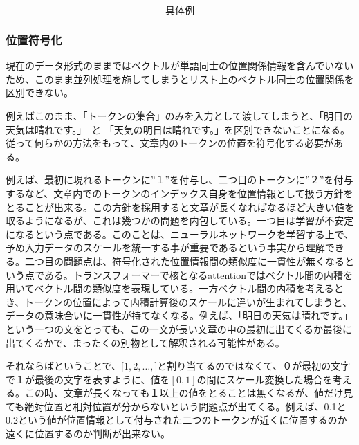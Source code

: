 
\begin{equation*}
  \text{具体例}
\end{equation*}


\subsubsection{位置符号化}



現在のデータ形式のままではベクトルが単語同士の位置関係情報を含んでいないため、このまま並列処理を施してしまうとリスト上のベクトル同士の位置関係を区別できない。　

例えばこのまま、「トークンの集合」のみを入力として渡してしまうと、「明日の天気は晴れです。」　と 「天気の明日は晴れです。」を区別できないことになる。従って何らかの方法をもって、文章内のトークンの位置を符号化する必要がある。

例えば、最初に現れるトークンに”１”を付与し、二つ目のトークンに”２”を付与するなど、文章内でのトークンのインデックス自身を位置情報として扱う方針をとることが出来る。この方針を採用すると文章が長くなればなるほど大きい値を取るようになるが、これは幾つかの問題を内包している。一つ目は学習が不安定になるという点である。このことは、ニューラルネットワークを学習する上で、予め入力データのスケールを統一する事が重要であるという事実から理解できる。二つ目の問題点は、符号化された位置情報間の類似度に一貫性が無くなるという点である。トランスフォーマーで核となるattentionではベクトル間の内積を用いてベクトル間の類似度を表現している。一方ベクトル間の内積を考えるとき、トークンの位置によって内積計算後のスケールに違いが生まれてしまうと、データの意味合いに一貫性が持てなくなる。例えば、「明日の天気は晴れです。」という一つの文をとっても、この一文が長い文章の中の最初に出てくるか最後に出てくるかで、まったくの別物として解釈される可能性がある。

それならばということで、$\lbrack1, 2, \ldots, \rbrack$と割り当てるのではなくて、０が最初の文字で１が最後の文字を表すように、値を$[0, 1]$の間にスケール変換した場合を考える。この時、文章が長くなっても１以上の値をとることは無くなるが、値だけ見ても絶対位置と相対位置が分からないという問題点が出てくる。例えば、0.1と0.2という値が位置情報として付与された二つのトークンが近くに位置するのか遠くに位置するのか判断が出来ない。

